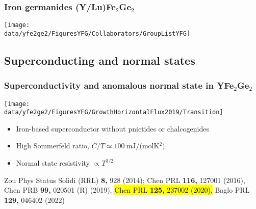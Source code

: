 \begin{frame}[plain,label=YFGCollab]
\frametitle {Iron germanides (Y/Lu)Fe$_2$Ge$_2$}
\vspace{0em}
\texttt{[image: \\data/yfe2ge2/FiguresYFG/Collaborators/GroupListYFG]}
\end{frame}

\subsection{Superconducting and normal states}
\begin{frame}[label=YFGIntro]
\frametitle{Superconductivity and anomalous normal state in YFe$_2$Ge$_2$}

\centerline{\texttt{[image: \\data/yfe2ge2/FiguresYFG/GrowthHorizontalFlux2019/Transition]} }
\begin{itemize}
\item
Iron-based superconductor without pnictides or chalcogenides
\item
High Sommerfeld ratio, $C/T \simeq \SI{100}{\mJ/(\mol\kelvin^2)}$
\item
Normal state resistivity $\propto T^{3/2}$
\end{itemize}

\vspace*{\fill}
\centerline{\makebox[\linewidth]{\rule{0.85\textwidth}{0.4pt}}}
\begin{center}
{\scriptsize Zou Phys Status Solidi (RRL) {\bf 8,} 928
  (2014); Chen PRL {\bf 116,} 127001 (2016), Chen PRB {\bf 99,} 020501 (R) (2019), \hl{Chen PRL {\bf 125,} 237002 (2020), } {Baglo PRL {\bf 129,} 046402 (2022)}}
  \end{center}
\end{frame}


